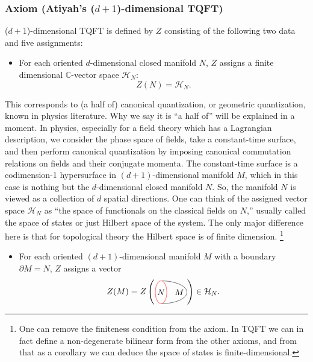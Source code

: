 \subsubsection*{Axiom (Atiyah's ($d+1$)-dimensional TQFT)}

($d+1$)-dimensional TQFT is defined by $Z$ consisting of the following
two data and five assignments:
\begin{itemize}
  \item For each oriented $d$-dimensional closed manifold $N$, $Z$ assigns a
finite dimensional $\mathbb{C}$-vector space $\mathcal{H}_{N}$:
\begin{equation}
  Z(N)  =  \mathcal{H}_{N}.
\end{equation}
\end{itemize}
This corresponds to (a half of) canonical quantization, or geometric
quantization, known in physics literature. Why we say it is ``a half
of'' will be explained in a moment. In physics, especially for a
field theory which has a Lagrangian description, we consider the phase
space of fields, take a constant-time surface, and then perform canonical
quantization by imposing canonical commutation relations on fields
and their conjugate momenta. The constant-time surface is a codimension-1
hypersurface in $(d+1)$-dimensional manifold $M$, which in this
case is nothing but the $d$-dimensional closed manifold $N$. So,
the manifold $N$ is viewed as a collection of $d$ spatial directions.
One can think of the assigned vector space $\mathcal{H}_{N}$ as ``the
space of functionals on the classical fields on $N$,'' usually called
the space of states or just Hilbert space of the system. The only
major difference here is that for topological theory the Hilbert space
is of finite dimension.%
%
\footnote{One can remove the finiteness condition from the axiom. In
TQFT we can in fact define a non-degenerate bilinear form from the other axioms,
and from that as a corollary we can deduce the space of states is
finite-dimensional. }
%
\begin{itemize}
  \item For each oriented $(d+1)$-dimensional manifold $M$ with a boundary
$\partial M=N$, $Z$ assigns a vector
\begin{equation}
  Z(M)
  =
  Z\left(
    \begin{tikzpicture}[scale=0.6, baseline=(x.base)]    \node (x) at (0,0) {\vphantom{x}};
        \def\bdyradius{0.8cm}

        \draw (0,-\bdyradius) arc[start angle=-90,end angle=90,x radius=1.8cm,y radius=\bdyradius] node[left=0.1,pos=0.5] {$M$};
        \draw[thick, red!50] (0,0) node[black] {$N$} circle[x radius=0.4cm,y radius=\bdyradius];

    \end{tikzpicture}
  \right)
  \in  \mathcal{H}_{N}.
\end{equation}
\end{itemize}
